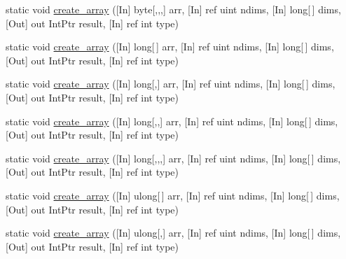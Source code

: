 \begin{DoxyCompactItemize}
\item 
static void \mbox{\hyperlink{classkhiva_1_1interop_1_1_d_l_l_array_aa796da5d4a3776a531530b752e7cb942}{create\+\_\+array}} (\mbox{[}In\mbox{]} byte\mbox{[},,,\mbox{]} arr, \mbox{[}In\mbox{]} ref uint ndims, \mbox{[}In\mbox{]} long\mbox{[}$\,$\mbox{]} dims, \mbox{[}Out\mbox{]} out Int\+Ptr result, \mbox{[}In\mbox{]} ref int type)
\item 
static void \mbox{\hyperlink{classkhiva_1_1interop_1_1_d_l_l_array_a636bb2570d6f589073f3fdd4807a9ef0}{create\+\_\+array}} (\mbox{[}In\mbox{]} long\mbox{[}$\,$\mbox{]} arr, \mbox{[}In\mbox{]} ref uint ndims, \mbox{[}In\mbox{]} long\mbox{[}$\,$\mbox{]} dims, \mbox{[}Out\mbox{]} out Int\+Ptr result, \mbox{[}In\mbox{]} ref int type)
\item 
static void \mbox{\hyperlink{classkhiva_1_1interop_1_1_d_l_l_array_aed6dca9b59d482b683588f1d2c6b333d}{create\+\_\+array}} (\mbox{[}In\mbox{]} long\mbox{[},\mbox{]} arr, \mbox{[}In\mbox{]} ref uint ndims, \mbox{[}In\mbox{]} long\mbox{[}$\,$\mbox{]} dims, \mbox{[}Out\mbox{]} out Int\+Ptr result, \mbox{[}In\mbox{]} ref int type)
\item 
static void \mbox{\hyperlink{classkhiva_1_1interop_1_1_d_l_l_array_a61f4af3a9023b61759a1b9b2df5a59e8}{create\+\_\+array}} (\mbox{[}In\mbox{]} long\mbox{[},,\mbox{]} arr, \mbox{[}In\mbox{]} ref uint ndims, \mbox{[}In\mbox{]} long\mbox{[}$\,$\mbox{]} dims, \mbox{[}Out\mbox{]} out Int\+Ptr result, \mbox{[}In\mbox{]} ref int type)
\item 
static void \mbox{\hyperlink{classkhiva_1_1interop_1_1_d_l_l_array_ac02456b0d3ab9af426aa2291debeaada}{create\+\_\+array}} (\mbox{[}In\mbox{]} long\mbox{[},,,\mbox{]} arr, \mbox{[}In\mbox{]} ref uint ndims, \mbox{[}In\mbox{]} long\mbox{[}$\,$\mbox{]} dims, \mbox{[}Out\mbox{]} out Int\+Ptr result, \mbox{[}In\mbox{]} ref int type)
\item 
static void \mbox{\hyperlink{classkhiva_1_1interop_1_1_d_l_l_array_a7ff83d119d055a4f07cfda93c810a561}{create\+\_\+array}} (\mbox{[}In\mbox{]} ulong\mbox{[}$\,$\mbox{]} arr, \mbox{[}In\mbox{]} ref uint ndims, \mbox{[}In\mbox{]} long\mbox{[}$\,$\mbox{]} dims, \mbox{[}Out\mbox{]} out Int\+Ptr result, \mbox{[}In\mbox{]} ref int type)
\item 
static void \mbox{\hyperlink{classkhiva_1_1interop_1_1_d_l_l_array_abee89097df2610bfd2c498c5872400ea}{create\+\_\+array}} (\mbox{[}In\mbox{]} ulong\mbox{[},\mbox{]} arr, \mbox{[}In\mbox{]} ref uint ndims, \mbox{[}In\mbox{]} long\mbox{[}$\,$\mbox{]} dims, \mbox{[}Out\mbox{]} out Int\+Ptr result, \mbox{[}In\mbox{]} ref int type)

\end{DoxyCompactItemize}
